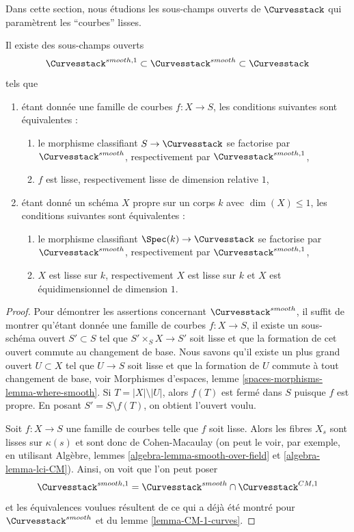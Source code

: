 \noindent
Dans cette section, nous étudions les sous-champs ouverts de $\Curvesstack$
qui paramètrent les ``courbes'' lisses.

\begin{lemma}
\label{lemma-smooth-curves}
Il existe des sous-champs ouverts
$$
\Curvesstack^{smooth, 1} \subset \Curvesstack^{smooth} \subset \Curvesstack
$$
tels que
\begin{enumerate}
\item étant donnée une famille de courbes $f : X \to S$, les conditions suivantes sont équivalentes :
\begin{enumerate}
\item le morphisme classifiant $S \to \Curvesstack$ se factorise
par $\Curvesstack^{smooth}$, respectivement par $\Curvesstack^{smooth, 1}$,
\item $f$ est lisse, respectivement lisse de dimension relative $1$,
\end{enumerate}
\item étant donné un schéma $X$ propre sur un corps $k$ avec
$\dim(X) \leq 1$, les conditions suivantes sont équivalentes :
\begin{enumerate}
\item le morphisme classifiant $\Spec(k) \to \Curvesstack$ se factorise
par $\Curvesstack^{smooth}$, respectivement par $\Curvesstack^{smooth, 1}$,
\item $X$ est lisse sur $k$, respectivement $X$ est lisse sur $k$ et
$X$ est équidimensionnel de dimension $1$.
\end{enumerate}
\end{enumerate}
\end{lemma}

\begin{proof}
Pour démontrer les assertions concernant $\Curvesstack^{smooth}$,
il suffit de montrer qu'étant donnée une famille de courbes
$f : X \to S$, il existe un sous-schéma ouvert $S' \subset S$
tel que $S' \times_S X \to S'$ soit lisse et que la
formation de cet ouvert commute au changement de base.
Nous savons qu'il existe un plus grand ouvert $U \subset X$ tel
que $U \to S$ soit lisse et que la formation de $U$ commute
à tout changement de base, voir
Morphismes d'espaces, lemme \ref{spaces-morphisms-lemma-where-smooth}.
Si $T = |X| \setminus |U|$, alors $f(T)$ est fermé dans $S$ puisque $f$ est propre.
En posant $S' = S \setminus f(T)$, on obtient l'ouvert voulu.

\medskip\noindent
Soit $f : X \to S$ une famille de courbes telle que $f$ soit lisse.
Alors les fibres $X_s$ sont lisses sur $\kappa(s)$ et sont donc
de Cohen-Macaulay (on peut le voir, par exemple, en utilisant
Algèbre, lemmes \ref{algebra-lemma-smooth-over-field} et
\ref{algebra-lemma-lci-CM}). Ainsi, on voit que l'on peut poser
$$
\Curvesstack^{smooth, 1} = \Curvesstack^{smooth} \cap
\Curvesstack^{CM, 1}
$$
et les équivalences voulues résultent de ce qui a déjà été
montré pour $\Curvesstack^{smooth}$ et du lemme \ref{lemma-CM-1-curves}.
\end{proof}

